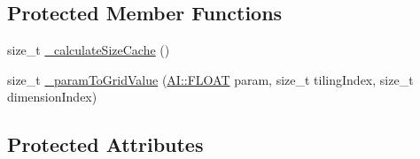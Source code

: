 \subsection*{Protected Member Functions}
\begin{DoxyCompactItemize}
\item 
size\+\_\+t \hyperlink{classAI_1_1Algorithm_1_1TileCode_a918fe826ad83e42c65bce7abfa35ad58}{\+\_\+calculate\+Size\+Cache} ()
\item 
size\+\_\+t \hyperlink{classAI_1_1Algorithm_1_1TileCode_a89e1188441fe9f07b4f9fa6394003a89}{\+\_\+param\+To\+Grid\+Value} (\hyperlink{namespaceAI_a41b74884a20833db653dded3918e05c3}{A\+I\+::\+F\+L\+O\+A\+T} param, size\+\_\+t tiling\+Index, size\+\_\+t dimension\+Index)
\end{DoxyCompactItemize}
\subsection*{Protected Attributes}
